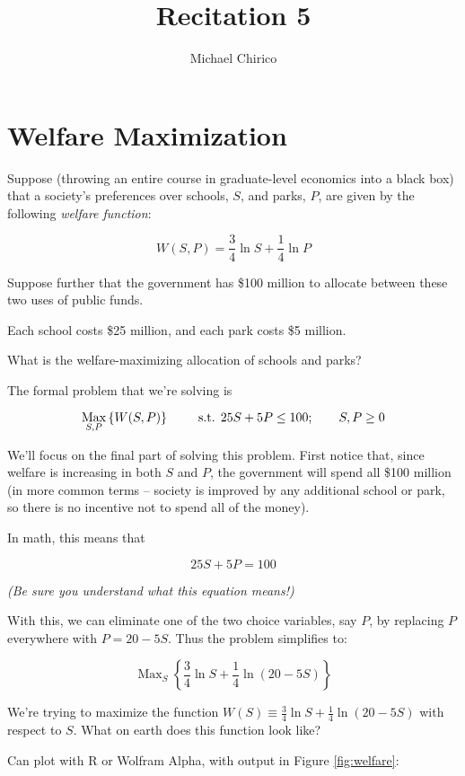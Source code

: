 \documentclass{article}
\DeclareMathOperator*{\Max}{Max}
\newcommand{\st}{\hbox{ s.t. }}
\begin{document}
\title{Recitation 5}
\author{Michael Chirico}

\maketitle

\section*{Welfare Maximization}

Suppose (throwing an entire course in graduate-level economics into a black box) that a society's preferences over schools, $S$, and parks, $P$, are given by the following \textit{welfare function}:

\[ W(S, P) = \frac34 \ln S + \frac14 \ln P \]

Suppose further that the government has \$100 million to allocate between these two uses of public funds.

Each school costs \$25 million, and each park costs \$5 million.

What is the welfare-maximizing allocation of schools and parks?

The formal problem that we're solving is

\[ \Max_{S, P} \left\{ W(S, P) \right\} \qquad \st 25S + 5P \leq 100; \qquad S, P \geq 0 \]

We'll focus on the final part of solving this problem. First notice that, since welfare is increasing in both $S$ and $P$, the government will spend all \$100 million (in more common terms -- society is improved by any additional school or park, so there is no incentive not to spend all of the money).

In math, this means that

\[ 25S + 5P = 100 \]

\textit{(Be sure you understand what this equation means!)} 

With this, we can eliminate one of the two choice variables, say $P$, by replacing $P$ everywhere with $P = 20 - 5S$. Thus the problem simplifies to:

\[ \Max_S \left\{ \frac34 \ln S + \frac14 \ln \left( 20 - 5S \right) \right\} \]

We're trying to maximize the function $W(S) \equiv \frac34 \ln S + \frac14 \ln \left( 20 - 5S \right)$ with respect to $S$. What on earth does this function look like?

Can plot with R or Wolfram Alpha, with output in Figure \ref{fig:welfare}:
\end{document}
